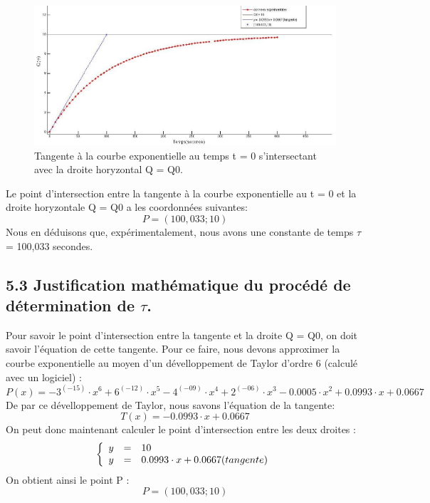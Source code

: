 \documentclass{report}
\begin{document}
\begin{figure}[ht!]
\centering
\includegraphics[width=140mm]{3-1graph243.jpg}
\caption{Tangente \`a la courbe exponentielle au temps t = 0 s'intersectant avec la droite horyzontal Q = Q0.}
\label{overflow}
\end{figure}
\pagebreak
Le point d'intersection entre la tangente \`a la courbe exponentielle au t = 0 et la droite horyzontale Q = Q0 a les coordonn\'ees suivantes:
\begin{equation}
   P = (100,033;10)
\end{equation}
Nous en d\'eduisons que, exp\'erimentalement, nous avons une constante de temps $\tau$ = 100,033 secondes.
\subsection*{5.3 Justification math\'ematique du proc\'ed\'e de d\'etermination de $\tau$.}
\hspace*{0.5cm}
Pour savoir le point d'intersection entre la tangente et la droite Q = Q0, on doit savoir l'\'equation de cette tangente.
Pour ce faire, nous devons approximer la courbe exponentielle au moyen d'un d\'evelloppement de Taylor d'ordre 6 (calcul\'e avec un logiciel) :
\begin{equation}
   P(x) = -3^{(-15)} \cdot x^6 + 6^{(-12)} \cdot x^5 - 4^{(-09)}\cdot x^4 + 2^{(-06)}\cdot x^3 - 0.0005\cdot x^2 + 0.0993\cdot x + 0.0667
\end{equation}
De par ce d\'evelloppement de Taylor, nous savons l'\'equation de la tangente:
\begin{equation}
   T(x) = -0.0993\cdot x + 0.0667
\end{equation}
On peut donc maintenant calculer le point d'intersection entre les deux droites :
\[
\left\{
\begin{array}{r c l}
y &=& 10\\
y &=& 0.0993\cdot x + 0.0667 (tangente)\\
\end{array}
\right.
\]
On obtient ainsi le point P :
\begin{equation}
   P = (100,033;10)
\end{equation}
\end{document}
